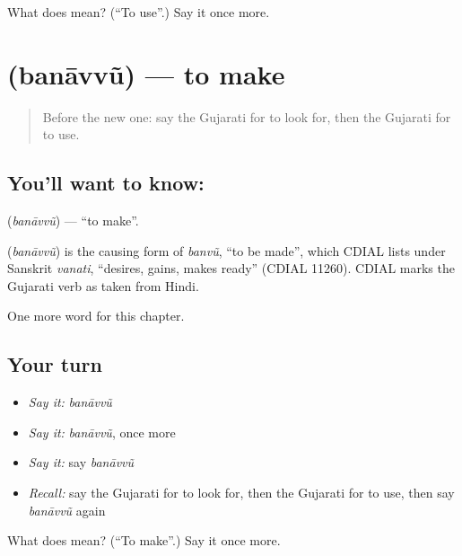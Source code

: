 \begin{tcolorbox}[breakable,colback=teal!4,colframe=teal!35!black,title={Before you move on}]
What does  mean? (\textquotedblleft{}To use\textquotedblright{}.) Say it once more.
\end{tcolorbox}
\section[\texorpdfstring{\gu{બનાવવું} (banāvvũ)}{બનાવવું (banāvvũ)}]{ (banāvvũ) — to make}

\label{lesson:GU-C139-banavvu}



\begin{quote}
Before the new one: say the Gujarati for to look for, then the Gujarati for to use.
\end{quote}

\subsection*{You'll want to know: }
\textbf{} (\emph{banāvvũ}) — \textquotedblleft{}to make\textquotedblright{}.

\begin{cousinweb}
\textbf{} (\emph{banāvvũ}) is the causing form of \emph{banvũ}, \textquotedblleft{}to be made\textquotedblright{}, which CDIAL lists under Sanskrit \emph{vanati}, \textquotedblleft{}desires, gains, makes ready\textquotedblright{} (CDIAL 11260). CDIAL marks the Gujarati verb as taken from Hindi.
\end{cousinweb}

\begin{grammarlens}[title={What you've built}]
One more word for this chapter.
\end{grammarlens}

\subsection*{Your turn}
\begin{itemize}
\raggedright
  \item \emph{Say it:} \emph{banāvvũ}
  \item \emph{Say it:} \emph{banāvvũ}, once more
  \item \emph{Say it:} say \emph{banāvvũ}
  \item \emph{Recall:} say the Gujarati for to look for, then the Gujarati for to use, then say \emph{banāvvũ} again
\end{itemize}

\begin{tcolorbox}[breakable,colback=teal!4,colframe=teal!35!black,title={Before you move on}]
What does  mean? (\textquotedblleft{}To make\textquotedblright{}.) Say it once more.
\end{tcolorbox}
